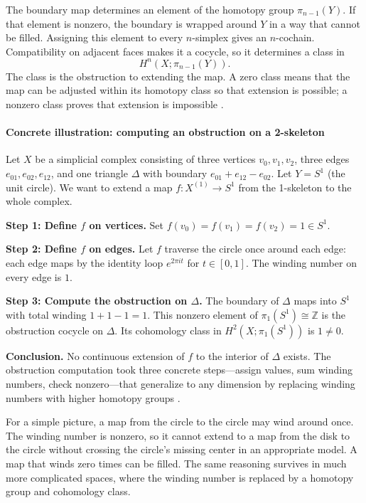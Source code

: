 The boundary map determines an element of the homotopy group $\pi_{n-1}(Y)$. If that element is nonzero, the boundary is wrapped around $Y$ in a way that cannot be filled. Assigning this element to every $n$-simplex gives an $n$-cochain. Compatibility on adjacent faces makes it a cocycle, so it determines a class in
\[
H^n(X;\pi_{n-1}(Y)).
\]
The class is the obstruction to extending the map. A zero class means that the map can be adjusted within its homotopy class so that extension is possible; a nonzero class proves that extension is impossible \cite{obstruction_theory_ref1}.

\paragraph{Concrete illustration: computing an obstruction on a 2-skeleton}
Let $X$ be a simplicial complex consisting of three vertices $v_0,v_1,v_2$, three edges $e_{01},e_{02},e_{12}$, and one triangle $\Delta$ with boundary $e_{01}+e_{12}-e_{02}$. Let $Y=S^1$ (the unit circle). We want to extend a map $f\colon X^{(1)}\to S^1$ from the 1-skeleton to the whole complex.

\textbf{Step 1: Define $f$ on vertices.} Set $f(v_0)=f(v_1)=f(v_2)=1\in S^1$.

\textbf{Step 2: Define $f$ on edges.} Let $f$ traverse the circle once around each edge: each edge maps by the identity loop $e^{2\pi i t}$ for $t\in[0,1]$. The winding number on every edge is $1$.

\textbf{Step 3: Compute the obstruction on $\Delta$.} The boundary of $\Delta$ maps into $S^1$ with total winding $1+1-1=1$. This nonzero element of $\pi_1(S^1)\cong\mathbb{Z}$ is the obstruction cocycle on $\Delta$. Its cohomology class in $H^2(X;\pi_1(S^1))$ is $1\neq 0$.

\textbf{Conclusion.} No continuous extension of $f$ to the interior of $\Delta$ exists. The obstruction computation took three concrete steps---assign values, sum winding numbers, check nonzero---that generalize to any dimension by replacing winding numbers with higher homotopy groups \cite{obstruction_theory_ref3}.

For a simple picture, a map from the circle to the circle may wind around once. The winding number is nonzero, so it cannot extend to a map from the disk to the circle without crossing the circle's missing center in an appropriate model. A map that winds zero times can be filled. The same reasoning survives in much more complicated spaces, where the winding number is replaced by a homotopy group and cohomology class.

